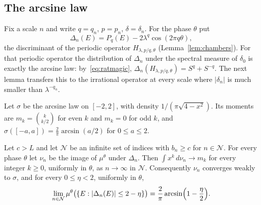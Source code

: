 \subsection{The arcsine law}

Fix a scale $n$ and write $q=q_n$, $p=p_n$, $\delta=\delta_n$. For the phase $\theta$ put
\[
\Delta_n(E)=P_{q}(E)-2\lambda^{q}\cos(2\pi q\theta),
\]
the discriminant of the periodic operator $H_{\lambda,p/q,\theta}$ (Lemma~\ref{lem:chambers}). For that periodic operator the distribution of $\Delta_n$ under the spectral measure of $\delta_0$ is exactly the arcsine law: by~\eqref{eq:ratmagic}, $\Delta_n(H_{\lambda,p/q,\theta})=S^q+S^{-q}$. The next lemma transfers this to the irrational operator at every scale where $|\delta_n|$ is much smaller than $\lambda^{-q_n}$.

Let $\sigma$ be the arcsine law on $[-2,2]$, with density $1/(\pi\sqrt{4-x^2})$. Its moments are $m_k=\binom{k}{k/2}$ for even $k$ and $m_k=0$ for odd $k$, and $\sigma([-a,a])=\frac2\pi\arcsin(a/2)$ for $0\le a\le2$.

\begin{lemma}\label{lem:arcsine}
Let $c>L$ and let $\mathcal N$ be an infinite set of indices with $b_n\ge c$ for $n\in\mathcal N$. For every phase $\theta$ let $\nu_n$ be the image of $\mu^\theta$ under $\Delta_n$. Then $\int x^k\,d\nu_n\to m_k$ for every integer $k\ge0$, uniformly in $\theta$, as $n\to\infty$ in $\mathcal N$. Consequently $\nu_n$ converges weakly to $\sigma$, and for every $0\le\eta<2$, uniformly in $\theta$,
\[
\lim_{n\in\mathcal N}\mu^\theta\bigl(\{E:|\Delta_n(E)|\le2-\eta\}\bigr)=\frac2\pi\arcsin\Bigl(1-\frac\eta2\Bigr).
\]
\end{lemma}

